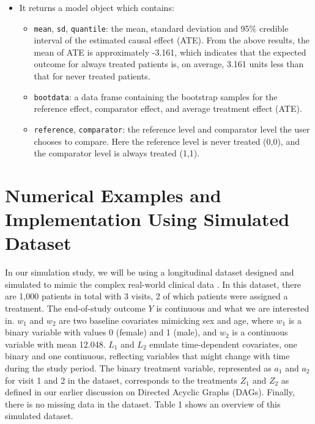 \begin{itemize}
\tightlist
\item
  It returns a model object which contains:

  \begin{itemize}
  \tightlist
  \item
    \texttt{mean}, \texttt{sd}, \texttt{quantile}: the mean, standard deviation and 95\%
    credible interval of the estimated causal effect (ATE). From the
    above results, the mean of ATE is approximately -3.161, which
    indicates that the expected outcome for always treated patients
    is, on average, 3.161 units less than that for never treated
    patients.
  \item
    \texttt{bootdata}: a data frame containing the bootstrap samples for
    the reference effect, comparator effect, and average treatment
    effect (ATE).
  \item
    \texttt{reference}, \texttt{comparator}: the reference level and comparator
    level the user chooses to compare. Here the reference level is
    never treated (0,0), and the comparator level is always treated
    (1,1).
  \end{itemize}
\end{itemize}

\section{Numerical Examples and Implementation Using Simulated Dataset}\label{numerical-examples-and-implementation-using-simulated-dataset}

In our simulation study, we will be using a longitudinal dataset
designed and simulated to mimic the complex real-world clinical data
\cite{liu2023section3}. In this dataset, there are 1,000 patients in
total with 3 visits, 2 of which patients were assigned a treatment. The
end-of-study outcome \(Y\) is continuous and what we are interested in.
\(w_1\) and \(w_2\) are two baseline covariates mimicking sex and age, where
\(w_1\) is a binary variable with values 0 (female) and 1 (male), and
\(w_2\) is a continuous variable with mean 12.048. \(L_1\) and \(L_2\) emulate
time-dependent covariates, one binary and one continuous, reflecting
variables that might change with time during the study period. The
binary treatment variable, represented as \(a_1\) and \(a_2\) for visit 1
and 2 in the dataset, corresponds to the treatments \(Z_1\) and \(Z_2\) as
defined in our earlier discussion on Directed Acyclic Graphs (DAGs).
Finally, there is no missing data in the dataset. \cite{liu2023section3}
Table 1 shows an overview of this simulated dataset.

